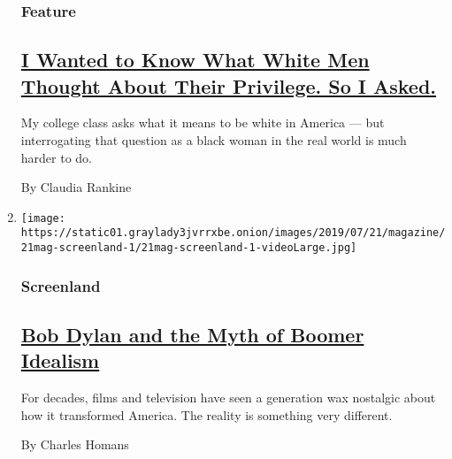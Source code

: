 \begin{enumerate}
  \hypertarget{feature-2}{%
  \subsubsection{Feature}\label{feature-2}}

  \hypertarget{i-wanted-to-know-what-white-men-thought-about-their-privilege-so-i-asked}{%
  \subsection{\texorpdfstring{\href{/2019/07/17/magazine/white-men-privilege.html}{I
  Wanted to Know What White Men Thought About Their Privilege. So I
  Asked.}}{I Wanted to Know What White Men Thought About Their Privilege. So I Asked.}}\label{i-wanted-to-know-what-white-men-thought-about-their-privilege-so-i-asked}}

  My college class asks what it means to be white in America --- but
  interrogating that question as a black woman in the real world is much
  harder to do.

  By Claudia Rankine
\item
  \texttt{[image: https://static01.graylady3jvrrxbe.onion/images/2019/07/21/magazine/21mag-screenland-1/21mag-screenland-1-videoLarge.jpg]}

  \hypertarget{screenland}{%
  \subsubsection{Screenland}\label{screenland}}

  \hypertarget{bob-dylan-and-the-myth-of-boomer-idealism}{%
  \subsection{\texorpdfstring{\href{/2019/07/17/magazine/bob-dylan-and-the-myth-of-boomer-idealism.html}{Bob
  Dylan and the Myth of Boomer
  Idealism}}{Bob Dylan and the Myth of Boomer Idealism}}\label{bob-dylan-and-the-myth-of-boomer-idealism}}

  For decades, films and television have seen a generation wax nostalgic
  about how it transformed America. The reality is something very
  different.

  By Charles Homans
\end{enumerate}

